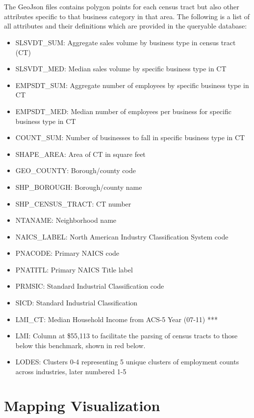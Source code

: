 \documentclass[article, 11pt]{article} %
\begin{document}
\\\\
The GeoJson files contains polygon points for each census tract but also other attributes specific to that business category in that area. The following is a list of all attributes and their definitions which are provided in the queryable database:
\begin{itemize} 
\item SLSVDT\_SUM: Aggregate sales volume by business type in census tract (CT)
\item SLSVDT\_MED: Median sales volume by specific business type in CT
\item EMPSDT\_SUM: Aggregate number of employees by specific business type in
CT
\item EMPSDT\_MED: Median number of employees per business for specific business
type in CT
\item COUNT\_SUM: Number of businesses to fall in specific business type in CT
\item SHAPE\_AREA: Area of CT in square feet
\item GEO\_COUNTY: Borough/county code
\item SHP\_BOROUGH: Borough/county name
\item SHP\_CENSUS\_TRACT: CT number
\item NTANAME: Neighborhood name
\item NAICS\_LABEL: North American Industry Classification System code
\item PNACODE: Primary NAICS code
\item PNATITL: Primary NAICS Title label
\item PRMSIC: Standard Industrial Classification code
\item SICD: Standard Industrial Classification
\item LMI\_CT: Median Household Income from ACS-5 Year (07-11) ***
\item LMI: Column at \$55,113 to facilitate the parsing of census tracts to those below this benchmark, shown in red below.
\item LODES: Clusters 0-4 representing 5 unique clusters of employment counts across industries, later numbered 1-5
\end{itemize}
\pagebreak


\section*{Mapping Visualization}
\end{document}
